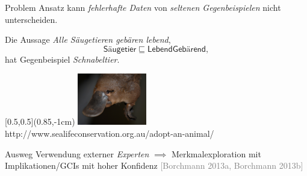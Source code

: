 \documentclass[ngerman]{beamer}
\newcommand{\pseudocite}[1]{\textcolor{gray}{[#1]}}
\begin{document}
\begin{frame}

  \onslide<+->

  \begin{block}{Problem}
    Ansatz kann \emph{fehlerhafte Daten} von \emph{seltenen Gegenbeispielen} nicht
    unterscheiden.
  \end{block}

  \onslide<+->

  \begin{Beispiel}
    Die Aussage \emph{Alle Säugetieren gebären lebend},
    \begin{equation*}
      \mathsf{Säugetier} \sqsubseteq \mathsf{LebendGebärend},
    \end{equation*}
    \onslide<+->
    hat Gegenbeispiel \emph{Schnabeltier}.
  
    \begin{textblock*}{\linewidth}[0.5,0.5](0.85\linewidth,-1cm)
      \centering
      \includegraphics[width=3cm]{platypus}\\[-2ex]
      {\fontsize{3pt}{4pt}\selectfont http://www.sealifeconservation.org.au/adopt-an-animal/}
    \end{textblock*}

  \end{Beispiel}

  \onslide<+->

  \begin{block}{Ausweg}
    Verwendung externer \emph{Experten}%
    \onslide<+->%
    $\implies$ Merkmalexploration mit Implikationen/GCIs mit hoher Konfidenz
    \pseudocite{Borchmann 2013a, Borchmann 2013b}
  \end{block}

\end{frame}
\end{document}
